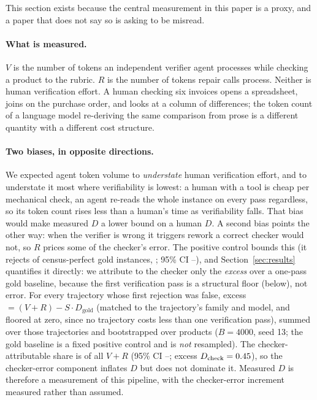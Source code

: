 \documentclass[11pt]{article}
\newcommand{\D}{\ensuremath{D}}
\newcommand{\SV}{\ensuremath{S}}
\newcommand{\VV}{\ensuremath{V}}
\newcommand{\RV}{\ensuremath{R}}
\begin{document}
This section exists because the central measurement in this paper is a proxy, and a paper that
does not say so is asking to be misread.

\paragraph{What is measured.} $\VV$ is the number of tokens an independent verifier agent processes
while checking a product to the rubric. $\RV$ is the number of tokens repair calls process. Neither
is human verification effort. A human checking six invoices opens a spreadsheet, joins on the
purchase order, and looks at a column of differences; the token count of a language model
re-deriving the same comparison from prose is a different quantity with a different cost structure.

\paragraph{Two biases, in opposite directions.} We expected agent token volume to \emph{understate}
human verification effort, and to understate it most where verifiability is lowest: a human with a
tool is cheap per mechanical check, an agent re-reads the whole instance on every pass regardless,
so its token count rises less than a human's time as verifiability falls. That bias would make
measured $\D$ a lower bound on a human $\D$. A second bias points the other way: when the verifier
is wrong it triggers rework a correct checker would not, so $\RV$ prices some of the checker's
error. The positive control bounds this (it rejects \VDgoldRej{} of census-perfect gold instances,
\VDgoldRejRate{}; 95\% CI \VDgoldRejLo--\VDgoldRejHi), and Section~\ref{sec:results} quantifies it
directly: we attribute to the checker only the \emph{excess} over a one-pass gold baseline, because
the first verification pass is a structural floor (below), not error. For every trajectory whose
first rejection was false, excess $= (\VV+\RV) - \SV\cdot\D_{\text{gold}}$ (matched to the
trajectory's family and model, and floored at zero, since no trajectory costs less than one
verification pass), summed over those trajectories and bootstrapped over products ($B=4000$, seed
13; the gold baseline is a fixed positive control and is \emph{not} resampled). The checker-attributable
share is \VDchkShare{} of all $\VV+\RV$ (95\% CI \VDchkShareLo--\VDchkShareHi; excess
$\D_{\text{check}}=\VDchkD$), so the checker-error component inflates $\D$ but does not dominate it.
Measured $\D$ is therefore a measurement of this pipeline, with the checker-error increment measured
rather than assumed.
\end{document}
